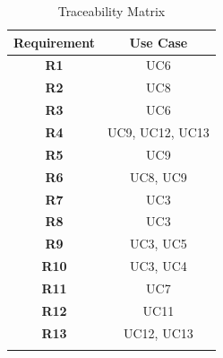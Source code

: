 \documentclass[12pt,oneside,a4paper]{article}
\begin{document}
\clearpage


\begin{table}[H]
\centering
    \begin{tabular}{|c|c|}
    \hline
    \textbf{Requirement} & \textbf{Use Case} \\
    \hline
    \textbf{R1} & UC6\\
    \hline
    \textbf{R2} & UC8\\
    \hline
    \textbf{R3} & UC6\\
    \hline
    \textbf{R4} & UC9, UC12, UC13\\
    \hline
    \textbf{R5} & UC9\\
    \hline
    \textbf{R6} & UC8, UC9\\
    \hline
    \textbf{R7} & UC3\\
    \hline
    \textbf{R8} & UC3\\
    \hline
    \textbf{R9} & UC3, UC5\\
    \hline
    \textbf{R10} & UC3, UC4\\
    \hline
    \textbf{R11} & UC7\\
    \hline
    \textbf{R12} & UC11\\
    \hline
    \textbf{R13} & UC12, UC13\\
    \lasthline
    \end{tabular}
    \caption{Traceability Matrix}
\end{table}
\end{document}
